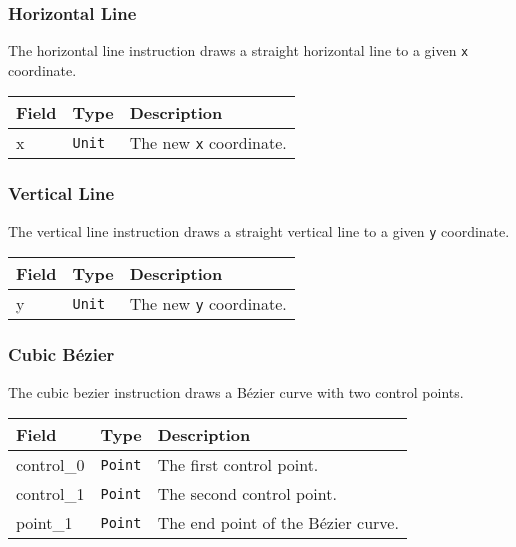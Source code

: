 \documentclass[]{article}
\begin{document}
\hypertarget{horizontal-line}{\subsubsection{Horizontal Line}\label{horizontal-line}}

The horizontal line instruction draws a straight horizontal line to a
given \texttt{x} coordinate.

\begin{longtable}[]{@{}p{1in}p{0.5in}p{4.5in}@{}}
\toprule
Field & Type & Description \\
\midrule
\endhead
x & \texttt{Unit} & The new \texttt{x} coordinate. \\
\bottomrule
\end{longtable}

\hypertarget{vertical-line}{\subsubsection{Vertical Line}\label{vertical-line}}

The vertical line instruction draws a straight vertical line to a given
\texttt{y} coordinate.

\begin{longtable}[]{@{}p{1in}p{0.5in}p{4.5in}@{}}
\toprule
Field & Type & Description \\
\midrule
\endhead
y & \texttt{Unit} & The new \texttt{y} coordinate. \\
\bottomrule
\end{longtable}

\hypertarget{cubic-bezier}{%
\subsubsection{Cubic Bézier}\label{cubic-bezier}}

The cubic bezier instruction draws a Bézier curve with two control
points.

\begin{longtable}[]{@{}p{1in}p{0.5in}p{4.5in}@{}}
\toprule
Field & Type & Description \\
\midrule
\endhead
control\_0 & \texttt{Point} & The first control point. \\
control\_1 & \texttt{Point} & The second control point. \\
point\_1 & \texttt{Point} & The end point of the Bézier curve. \\
\bottomrule
\end{longtable}
\end{document}
